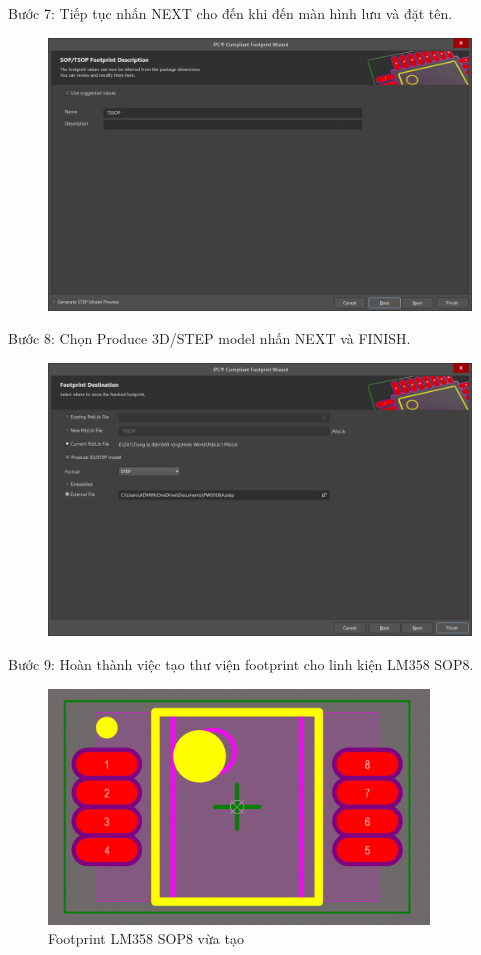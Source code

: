         Bước 7: Tiếp tục nhấn NEXT cho đến khi đến màn hình lưu và đặt tên.
        \begin{figure}[H]
            \centering
            \includegraphics[width=1\textwidth]{pictures/ch3.9.png}
        \end{figure}
        Bước 8: Chọn Produce 3D/STEP model nhấn NEXT và FINISH.
        \begin{figure}[H]
            \centering
            \includegraphics[width=1\textwidth]{pictures/ch3.10.png}
        \end{figure}
        \cleardoublepage
        Bước 9: Hoàn thành việc tạo thư viện footprint cho linh kiện LM358 SOP8.
        \begin{figure}[H]
            \centering
            \includegraphics[width=0.9\textwidth]{pictures/ch3.11a.png}
            \caption{Footprint LM358 SOP8 vừa tạo} 
        \end{figure}
